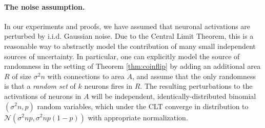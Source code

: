\documentclass{article}
\newtheorem{corollary}[theorem]{Corollary}
\theoremstyle{remark}
\newcommand{\1}{\mathbbm{1}}
\begin{document}

\paragraph{The noise assumption.}
In our experiments and proofs, we have assumed that neuronal activations are perturbed by i.i.d. Gaussian noise. Due to the Central Limit Theorem, this is a reasonable way to abstractly model the contribution of many small independent sources of uncertainty. In particular, one can explicitly model the source of randomness in the setting of Theorem \ref{thm:coinflip} by adding an additional area $R$ of size $\sigma^2 n$ with connections to area $A$, and assume that the only randomness is that a \emph{random set} of $k$ neurons fires in $R$. The resulting perturbations to the activations of neurons in $A$ will be independent, identically-distributed binomial $(\sigma^2 n, p)$ random variables, which under the CLT converge in distribution to $\mathcal N(\sigma^2 np, \sigma^2 np(1-p))$ with appropriate normalization.
\end{document}
